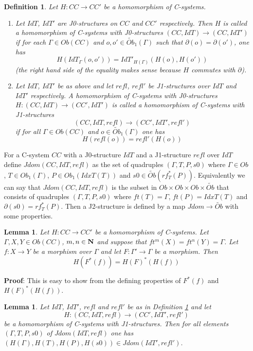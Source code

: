 \documentclass[12pt]{article}
\newenvironment{myproof}{{\bf Proof}:}{\vskip 5mm }
\newtheorem{lemma}[proposition]{Lemma}
\newtheorem{definition}[proposition]{Definition}
\newcommand{\llabel}[1]{\label{#1}}
\newcommand{\sr}{\rightarrow}
\newcommand{\nn}{{\bf N\rm}}
\newcommand{\wt}{\widetilde}
\begin{document}
%
\begin{definition}
\llabel{2015.04.06.def1}
Let $H:CC\sr CC'$ be a homomorphism of C-systems.
%
\begin{enumerate}
\item Let $IdT$, $IdT'$ are J0-structures on $CC$ and $CC'$ respectively.  Then $H$ is called a homomorphism of C-systems with J0-structures $(CC,IdT)\sr (CC,IdT')$ if for each $\Gamma\in Ob(CC)$ and $o,o'\in\wt{Ob}_1(\Gamma)$ such that $\partial(o)=\partial(o')$, one has 
%
$$H(IdT_{\Gamma}(o,o'))=IdT'_{H(\Gamma)}(H(o),H(o'))$$
%
(the right hand side of the equality makes sense because $H$ commutes with $\partial$).
% 
\item Let $IdT$, $IdT'$ be as above and let $refl$, $refl'$ be J1-structures over $IdT$ and $IdT'$ respectively. A homomorphism of C-systems with J0-structures $H:(CC,IdT)\sr (CC',IdT')$ is called a homomorphism of C-systems with J1-structures 
%
$$(CC,IdT,refl)\sr (CC',IdT',refl')$$
%
if for all $\Gamma\in Ob(CC)$ and $o\in \wt{Ob}_1(\Gamma)$ one has
%
$$H(refl(o))=refl'(H(o))$$
%
\end{enumerate}
\end{definition}
%
For a C-system $CC$ with a J0-structure $IdT$ and a J1-structure $refl$ over $IdT$ define $Jdom(CC,IdT,refl)$ as the set of quadruples $(\Gamma,T,P,s0)$ where $\Gamma\in Ob$, $T\in Ob_1(\Gamma)$, $P\in Ob_1(IdxT(T))$ and $s0\in \wt{Ob}(rf_T^*(P))$. Equivalently we can say that $Jdom(CC,IdT,refl)$ is the subset in $Ob\times Ob\times Ob\times \wt{Ob}$ that consists of quadruples $(\Gamma,T,P,s0)$ where $ft(T)=\Gamma$, $ft(P)=IdxT(T)$ and $\partial(s0)=rf_T^*(P)$. Then a J2-structure is defined by a map $Jdom\sr \wt{Ob}$ with some properties.
%
\begin{lemma}
\llabel{2015.04.06.l3}
Let $H:CC\sr CC'$ be a homomorphism of C-systems. Let $\Gamma,X,Y\in Ob(CC)$, $m,n\in\nn$ and suppose that $ft^m(X)=ft^{n}(Y)=\Gamma$. Let $f:X\sr Y$ be a morphism over $\Gamma$ and let $F:\Gamma'\sr \Gamma$ be a morphism. Then 
%
$$H(F^*(f))=H(F)^*(H(f))$$
%
\end{lemma}
%
\begin{myproof}
This is easy to show from the defining properties of $F^*(f)$ and $H(F)^*(H(f))$.
\end{myproof}
%
%
\begin{lemma}
\llabel{2015.04.06.l2}
Let $IdT$, $IdT'$, $refl$ and $refl'$ be as in Definition \ref{2015.04.06.def1} and let 
%
$$H:(CC,IdT,refl)\sr (CC',IdT',refl')$$
%
be a homomorphism of C-systems with J1-structures. Then for all elements $(\Gamma,T,P,s0)$ of  $Jdom(IdT,refl)$ one has $(H(\Gamma),H(T),H(P),H(s0))\in Jdom(IdT',refl')$.
\end{lemma}
\end{document}
